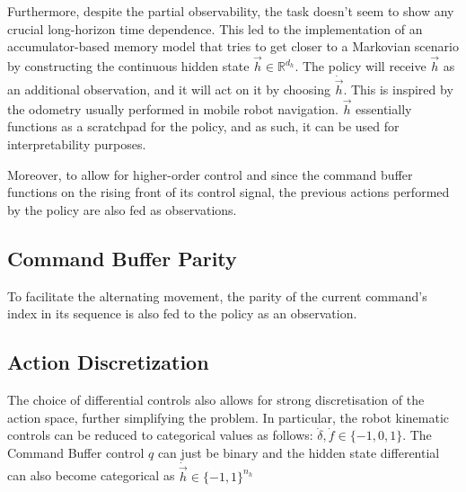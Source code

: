 \documentclass[11pt,a4paper,twocolumn]{article}
\begin{document}
Furthermore, despite the partial observability, the task doesn't seem to show any crucial long-horizon time dependence. This led to the implementation of an accumulator-based memory model that tries to get closer to a Markovian scenario by constructing the continuous hidden state $\vec{h}\in\mathbb{R}^{d_h}$. The policy will receive $\vec{h}$ as an additional observation, and it will act on it by choosing $\dot{\vec{h}}$. This is inspired by the odometry usually performed in mobile robot navigation. $\vec{h}$ essentially functions as a scratchpad for the policy, and as such, it can be used for interpretability purposes.

Moreover, to allow for higher-order control and since the command buffer functions on the rising front of its control signal, the previous actions performed by the policy are also fed as observations.

\subsection{Command Buffer Parity}
To facilitate the alternating movement, the parity of the current command's index in its sequence is also fed to the policy as an observation.

\subsection{Action Discretization}
The choice of differential controls also allows for strong discretisation of the action space, further simplifying the problem. In particular, the robot kinematic controls can be reduced to categorical values as follows: $\dot{\delta}, \dot{f} \in \{-1, 0, 1\}$. The Command Buffer control $q$ can just be binary and the hidden state differential can also become categorical as $\dot{\vec{h}}\in \{-1, 1\}^{n_h}$ 
\end{document}
